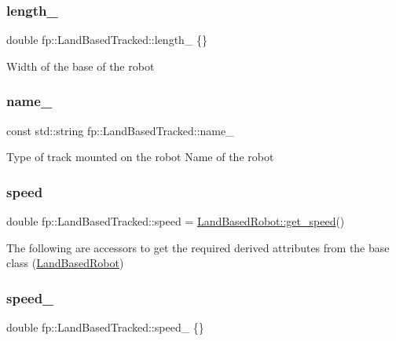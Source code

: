 \subsubsection{\texorpdfstring{length\+\_\+}{length\_}}
{\footnotesize\ttfamily double fp\+::\+Land\+Based\+Tracked\+::length\+\_\+ \{\}\hspace{0.3cm}{\ttfamily [protected]}}

Width of the base of the robot \mbox{\label{classfp_1_1_land_based_tracked_abf54193cc934e3e3833a2ed3767eee9a}} 
\subsubsection{\texorpdfstring{name\+\_\+}{name\_}}
{\footnotesize\ttfamily const std\+::string fp\+::\+Land\+Based\+Tracked\+::name\+\_\+\hspace{0.3cm}{\ttfamily [protected]}}

Type of track mounted on the robot Name of the robot \mbox{\label{classfp_1_1_land_based_tracked_a08b67f2f7c1da6db1c4d6cf4de689573}} 
\subsubsection{\texorpdfstring{speed}{speed}}
{\footnotesize\ttfamily double fp\+::\+Land\+Based\+Tracked\+::speed = \hyperlink{classfp_1_1_land_based_robot_a44fed3a00505f6679ff8505aebae4505}{Land\+Based\+Robot\+::get\+\_\+speed}()}

The following are accessors to get the required derived attributes from the base class (\hyperlink{classfp_1_1_land_based_robot}{Land\+Based\+Robot}) \mbox{\label{classfp_1_1_land_based_tracked_ae4203781ac58381e57fe189d6bf9908a}} 
\subsubsection{\texorpdfstring{speed\+\_\+}{speed\_}}
{\footnotesize\ttfamily double fp\+::\+Land\+Based\+Tracked\+::speed\+\_\+ \{\}\hspace{0.3cm}{\ttfamily [protected]}}

